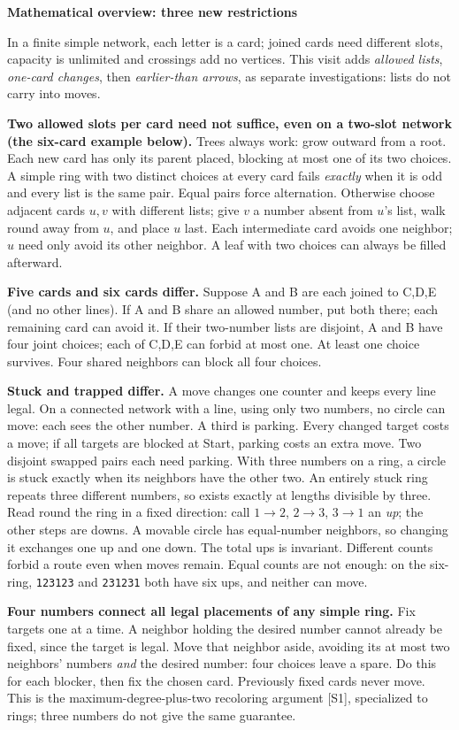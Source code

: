 \documentclass[10pt]{article}
\newcommand{\head}[1]{\par{\large\bfseries #1}\par}
\newcommand{\word}[1]{\texttt{#1}}
\begin{document}
\head{Mathematical overview: three new restrictions}
In a finite simple network, each letter is a card; joined cards need different slots, capacity is unlimited and crossings add no vertices. This visit adds \emph{allowed lists}, \emph{one-card changes}, then \emph{earlier-than arrows}, as separate investigations: lists do not carry into moves.

\textbf{Two allowed slots per card need not suffice, even on a two-slot network (the six-card example below).} Trees always work: grow outward from a root. Each new card has only its parent placed, blocking at most one of its two choices. A simple ring with two distinct choices at every card fails \emph{exactly} when it is odd and every list is the same pair. Equal pairs force alternation. Otherwise choose adjacent cards $u,v$ with different lists; give $v$ a number absent from $u$'s list, walk round away from $u$, and place $u$ last. Each intermediate card avoids one neighbor; $u$ need only avoid its other neighbor. A leaf with two choices can always be filled afterward.

\textbf{Five cards and six cards differ.} Suppose A and B are each joined to C,D,E (and no other lines). If A and B share an allowed number, put both there; each remaining card can avoid it. If their two-number lists are disjoint, A and B have four joint choices; each of C,D,E can forbid at most one. At least one choice survives. Four shared neighbors can block all four choices.

\textbf{Stuck and trapped differ.} A move changes one counter and keeps every line legal. On a connected network with a line, using only two numbers, no circle can move: each sees the other number. A third is parking. Every changed target costs a move; if all targets are blocked at Start, parking costs an extra move. Two disjoint swapped pairs each need parking. With three numbers on a ring, a circle is stuck exactly when its neighbors have the other two. An entirely stuck ring repeats three different numbers, so exists exactly at lengths divisible by three. Read round the ring in a fixed direction: call $1\to2$, $2\to3$, $3\to1$ an \emph{up}; the other steps are downs. A movable circle has equal-number neighbors, so changing it exchanges one up and one down. The total ups is invariant. Different counts forbid a route even when moves remain. Equal counts are not enough: on the six-ring, \word{123123} and \word{231231} both have six ups, and neither can move.

\textbf{Four numbers connect all legal placements of any simple ring.} Fix targets one at a time. A neighbor holding the desired number cannot already be fixed, since the target is legal. Move that neighbor aside, avoiding its at most two neighbors' numbers \emph{and} the desired number: four choices leave a spare. Do this for each blocker, then fix the chosen card. Previously fixed cards never move. This is the maximum-degree-plus-two recoloring argument [S1], specialized to rings; three numbers do not give the same guarantee.
\end{document}
